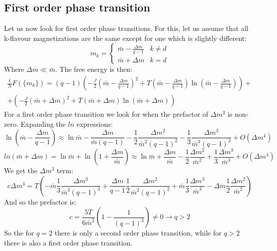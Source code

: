 \documentclass{article}
\begin{document}
\subsection{First order phase transition}
Let us now look for first order phase transitions. For this, let us assume that all k-flavour magnetizations are the same except for one which is slightly different:
\begin{equation}
    m_k = \begin{cases}
        \bar{m} - \frac{\Delta m}{q - 1} & k \ne d \\ \bar{m} + \Delta m & k = d
    \end{cases}
\end{equation}
Where $\Delta m \ll \bar{m}$. The free energy is then:
\begin{equation}
\begin{gathered}
    \frac{1}{N}F(\{m_k\}) =
    \left(q - 1\right)\left(-\frac{J}{2}\left(\bar{m} - \frac{\Delta m}{q - 1}\right)^2 + T\left(\bar{m} - \frac{\Delta m}{q - 1}\right) \ln\left(\bar{m} - \frac{\Delta m}{q - 1}\right)\right) + \\ +
    \left(-\frac{J}{2}\left(\bar{m} + \Delta m\right)^2 + T\left(\bar{m} + \Delta m\right) \ln\left(\bar{m} + \Delta m\right)\right)
\end{gathered}
\end{equation}
For a first order phase transition we look for when the prefactor of $\Delta m^3$ is non-zero. Expanding the $ln$ expressions:
\begin{equation}
    \ln\left(\bar{m} - \frac{\Delta m}{q - 1}\right) \approx \ln \bar{m} - \frac{\Delta m}{\bar{m}(q - 1)} - \frac{1}{2}\frac{\Delta m^2}{\bar{m}^2(q - 1)^2} - \frac{1}{3}\frac{\Delta m^3}{\bar{m}^3(q - 1)^3} + O(\Delta m^4)
\end{equation}
\begin{equation}
    ln(\bar{m} + \Delta m) = \ln \bar{m} + \ln(1 + \frac{\Delta m}{\bar{m}}) \approx \ln \bar{m} + \frac{\Delta m}{\bar{m}} - \frac{1}{2}\frac{\Delta m^2}{\bar{m}^2} + \frac{1}{3}\frac{\Delta m^3}{\bar{m}^3} + O(\Delta m^4)
\end{equation}
We get the $\Delta m^3$ term:
\begin{equation}
    c\Delta m^3 = T\left(-\bar{m}\frac{1}{3}\frac{\Delta m^3}{\bar{m}^3(q - 1)^3} + \frac{\Delta m}{q - 1}\frac{1}{2}\frac{\Delta m^2}{\bar{m}^2(q - 1)^2} + \bar{m}\frac{1}{3}\frac{\Delta m^3}{\bar{m}^3} - \Delta m \frac{1}{2}\frac{\Delta m^2}{\bar{m}^2}\right)
\end{equation}
And so the prefactor is:
\begin{equation}
    c = \frac{5T}{6\bar{m}^2}\left(1 - \frac{1}{(q-1)^3}\right) \ne 0
    \rightarrow q > 2
\end{equation}
So the for $q = 2$ there is only a second order phase transition, while for $q > 2$ there is also a first order phase transition.
\end{document}
